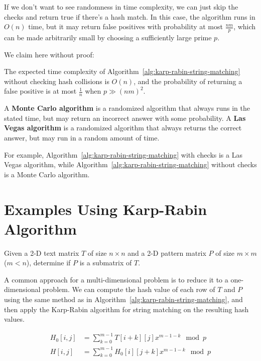 If we don't want to see randomness in time complexity, we can just skip the checks and return true if there's a hash match.
In this case, the algorithm runs in $O(n)$ time, but it may return false positives with probability at most $\frac{n m}{p}$, which can be made arbitrarily small by choosing a sufficiently large prime $p$.

We claim here without proof:

\begin{theorem}
	The expected time complexity of Algorithm~\ref{alg:karp-rabin-string-matching}                   without checking hash collisions is $O(n)$, and the probability of returning a false positive is at most $\frac{1}{n}$ when $p \gg (n m)^2$.
\end{theorem}

\begin{definition}
	A \textbf{Monte Carlo algorithm} is a randomized algorithm that always runs in the stated time, but may return an incorrect answer with some probability. A \textbf{Las Vegas algorithm} is a randomized algorithm that always returns the correct answer, but may run in a random amount of time.

	For example, Algorithm~\ref{alg:karp-rabin-string-matching} with checks is a Las Vegas algorithm, while Algorithm~\ref{alg:karp-rabin-string-matching} without checks is a Monte Carlo algorithm.
\end{definition}

\section{Examples Using Karp-Rabin Algorithm}

\begin{question}
	Given a 2-D text matrix $T$ of size $n\times n$ and a 2-D pattern matrix $P$ of size $m\times m$ ($m<n$), determine if $P$ is a submatrix of $T$.
\end{question}

A common approach for a multi-dimensional problem is to reduce it to a one-dimensional problem. We can compute the hash value of each row of $T$ and $P$ using the same method as in Algorithm~\ref{alg:karp-rabin-string-matching}, and then apply the Karp-Rabin algorithm for string matching on the resulting hash values.

\begin{align*}
	H_0 [i,j] & = \sum_{k=0}^{m-1} T[i+k][j] x^{m-1-k} \mod p    \\
	H[i,j]    & = \sum_{k=0}^{m-1} H_0 [i][j+k] x^{m-1-k} \mod p
\end{align*}

